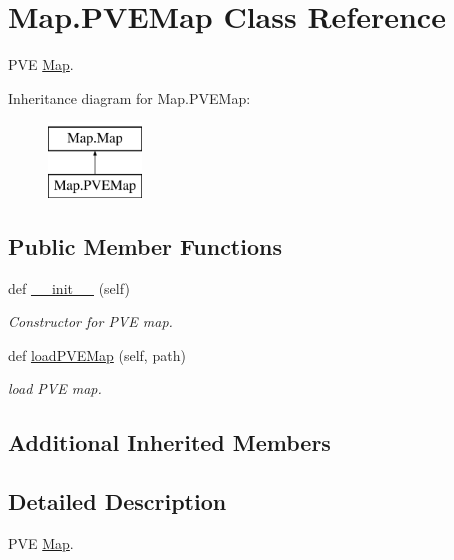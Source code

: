 \hypertarget{class_map_1_1_p_v_e_map}{}\section{Map.\+P\+V\+E\+Map Class Reference}
\label{class_map_1_1_p_v_e_map}


P\+VE \mbox{\hyperlink{class_map_1_1_map}{Map}}.  


Inheritance diagram for Map.\+P\+V\+E\+Map\+:\begin{figure}[H]
\begin{center}
\leavevmode
\includegraphics[height=2.000000cm]{class_map_1_1_p_v_e_map}
\end{center}
\end{figure}
\subsection*{Public Member Functions}
\begin{DoxyCompactItemize}
\item 
def \mbox{\hyperlink{class_map_1_1_p_v_e_map_ae4a033a205c18ef5ba14c47aceb75306}{\+\_\+\+\_\+init\+\_\+\+\_\+}} (self)
\begin{DoxyCompactList}\small\item\em Constructor for P\+VE map. \end{DoxyCompactList}\item 
def \mbox{\hyperlink{class_map_1_1_p_v_e_map_ab94acdb2d91994c70b33351da1dac753}{load\+P\+V\+E\+Map}} (self, path)
\begin{DoxyCompactList}\small\item\em load P\+VE map. \end{DoxyCompactList}\end{DoxyCompactItemize}
\subsection*{Additional Inherited Members}


\subsection{Detailed Description}
P\+VE \mbox{\hyperlink{class_map_1_1_map}{Map}}. 

